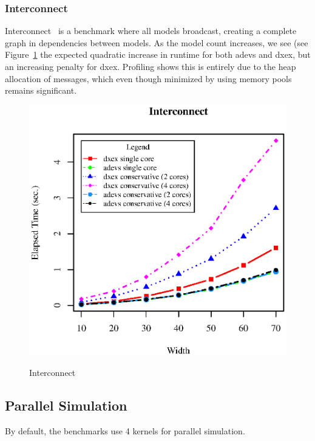 \subsubsection{Interconnect}
Interconnect~\cite{MasterThesis} is a benchmark where all models broadcast, creating a complete graph in dependencies between models. As the model count increases, we see (see Figure~\ref{fig:Interconnect} the expected quadratic increase in runtime for both adevs and dxex, but an increasing penalty for dxex. Profiling shows this is entirely due to the heap allocation of messages, which even though minimized by using memory pools remains significant.
\begin{figure}[h]
	\includegraphics[width=.5\textwidth]{fig/fig3.eps}
	\label{fig3.eps}
	\caption{Interconnect}
	\label{fig:Interconnect}
\end{figure}

\subsection{Parallel Simulation}
By default, the benchmarks use 4 kernels for parallel simulation.
